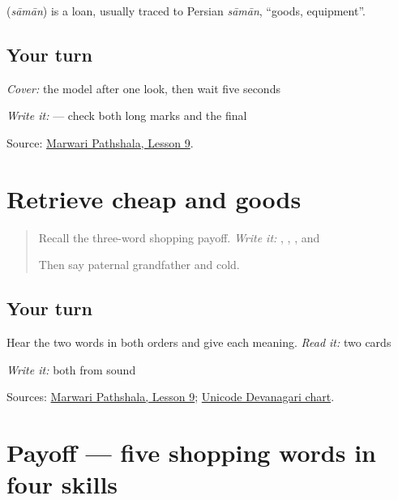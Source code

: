 \begin{cousinweb}
\textbf{} (\emph{sāmān}) is a loan, usually traced to Persian \emph{sāmān}, \textquotedblleft{}goods, equipment\textquotedblright{}.
\end{cousinweb}

\subsection*{Your turn}
\emph{Cover:} the model after one look, then wait five seconds

\emph{Write it:} \textbf{} — check both long \textbf{} marks and the final \textbf{}

\begin{tcolorbox}[breakable,colback=teal!4,colframe=teal!35!black,title={Before you move on}]
Source: \href{https://www.marwaripathshala.com/marwari-lesson-9-english}{Marwari Pathshala, Lesson 9}.
\end{tcolorbox}
\section[Practice]{Retrieve cheap and goods}

\label{lesson:MW-R14-shopping-new-two}



\begin{quote}
Recall the three-word shopping payoff. \emph{Write it:} \textbf{}, \textbf{}, \textbf{}, and \textbf{}

Then say paternal grandfather and cold.
\end{quote}

\subsection*{Your turn}
Hear the two words in both orders and give each meaning. \emph{Read it:} two cards

\emph{Write it:} both from sound

\begin{tcolorbox}[breakable,colback=teal!4,colframe=teal!35!black,title={Before you move on}]
Sources: \href{https://www.marwaripathshala.com/marwari-lesson-9-english}{Marwari Pathshala, Lesson 9}; \href{https://www.unicode.org/charts/PDF/U0900.pdf}{Unicode Devanagari chart}.
\end{tcolorbox}
\section[Practice]{Payoff — five shopping words in four skills}

